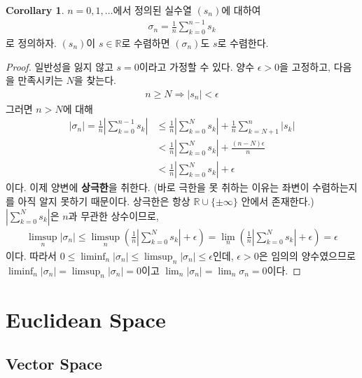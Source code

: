 \documentclass[12pt]{article}
\theoremstyle{definition}
\newtheorem{cor}[thm]{Corollary}
\def\RR{\mathbb{R}}
\def\eps{\epsilon}
\newcommand{\abs}[1]{\left\vert#1\right\vert}
\begin{document}
	\begin{cor}
		\(n = 0, 1, \ldots\)에서 정의된 실수열 \((s_n)\)에 대하여
		\begin{gather*}
			\sigma_n = \frac{1}{n}\sum_{k=0}^{n-1}s_k
		\end{gather*}
		로 정의하자. \((s_n)\)이 \(s \in \RR\)로 수렴하면 \((\sigma_n)\)도 \(s\)로 수렴한다.
	\end{cor}
	\begin{proof}
		일반성을 잃지 않고 \(s = 0\)이라고 가정할 수 있다. 양수 \(\eps > 0\)을 고정하고, 다음을 만족시키는 \(N\)을 찾는다.
		\begin{gather*}
			n \ge N \Longrightarrow \abs{s_n} < \eps
		\end{gather*}
		그러면 \(n > N\)에 대해
		\begin{align*}
			\abs{\sigma_n} = \frac{1}{n}\abs{\sum_{k=0}^{n-1}s_k} &\le \frac{1}{n}\abs{\sum_{k=0}^{N}s_k} + \frac{1}{n}\sum_{k=N+1}^{n}\abs{s_k}\\
			&< \frac{1}{n}\abs{\sum_{k=0}^{N}s_k} + \frac{(n-N)\eps}{n}\\
			&<  \frac{1}{n}\abs{\sum_{k=0}^{N}s_k} + \eps
		\end{align*}
		이다. 이제 양변에 \textbf{상극한}을 취한다. (바로 극한을 못 취하는 이유는 좌변이 수렴하는지를 아직 알지 못하기 때문이다. 상극한은 항상 \(\RR \cup \{\pm \infty\}\) 안에서 존재한다.) \(\abs{\sum_{k=0}^{N}s_k}\)은 \(n\)과 무관한 상수이므로,
		\begin{gather*}
			\limsup_n \abs{\sigma_n} \le \limsup_n \left ( \frac{1}{n}\abs{\sum_{k=0}^{N}s_k} + \eps \right )= \lim_n \left ( \frac{1}{n}\abs{\sum_{k=0}^{N}s_k} + \eps \right )= \eps
		\end{gather*}
		이다. 따라서 \(0 \le \liminf_n \abs{\sigma_n} \le \limsup_n \abs{\sigma_n} \le \eps\)인데, \(\eps > 0\)은 임의의 양수였으므로 \(\liminf_n \abs{\sigma_n} = \limsup_n \abs{\sigma_n} = 0\)이고 \(\lim_n \abs{\sigma_n} = \lim_n \sigma_n = 0\)이다.
	\end{proof}

\newpage

\section{Euclidean Space} \label{sec euc}
\subsection{Vector Space}
\end{document}
